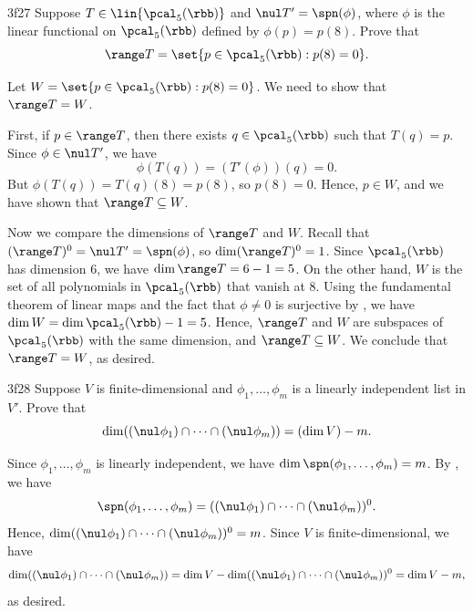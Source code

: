\begin{exercise}{3f27}
    Suppose $T \in \lin{\pcal_5(\rbb)}$ and $\nul T' = \spn(\phi)$, where $\phi$ is the linear functional on $\pcal_5(\rbb)$ defined by $\phi(p) = p(8)$.
	Prove that
    \[
    	\range T = \set{p \in \pcal_5(\rbb) : p(8) = 0}.
    \]
\end{exercise}

\begin{sol}
    Let $W = \set{p \in \pcal_5(\rbb) : p(8) = 0}$.
	We need to show that $\range T = W$.

    First, if $p \in \range T$, then there exists $q \in \pcal_5(\rbb)$ such that $T(q) = p$.
	Since $\phi \in \nul T'$, we have
    \[
    	\phi(T(q)) = (T'(\phi))(q) = 0.
    \]
    But $\phi(T(q)) = T(q)(8) = p(8)$, so $p(8) = 0$.
	Hence, $p \in W$, and we have shown that $\range T \subseteq W$.

    Now we compare the dimensions of $\range T$ and $W$.
	Recall that $(\range T)^0 = \nul T' = \spn(\phi)$, so $\dim (\range T)^0 = 1$.
	Since $\pcal_5(\rbb)$ has dimension $6$, we have $\dim \range T = 6 - 1 = 5$.
	On the other hand, $W$ is the set of all polynomials in $\pcal_5(\rbb)$ that vanish at $8$.
	Using the fundamental theorem of linear maps and the fact that $\phi \neq 0$ is surjective by , we have $\dim W = \dim \pcal_5(\rbb) - 1 = 5$.
	Hence, $\range T$ and $W$ are subspaces of $\pcal_5(\rbb)$ with the same dimension, and $\range T \subseteq W$.
	We conclude that $\range T = W$, as desired.
\end{sol}

\begin{exercise}{3f28}
    Suppose $V$ is finite-dimensional and $\phi_1, \ldots, \phi_m$ is a linearly independent list in $V'$.
	Prove that
    \[
    	\dim((\nul \phi_1) \cap \cdots \cap (\nul \phi_m)) = (\dim V) - m.
    \]
\end{exercise}

\begin{sol}
    Since $\phi_1, \ldots, \phi_m$ is linearly independent, we have $\dim \spn(\phi_1, \ldots, \phi_m) = m$.
	By , we have
    \[
    	\spn(\phi_1, \ldots, \phi_m) = ((\nul \phi_1) \cap \cdots \cap (\nul \phi_m))^0.
    \]
    Hence, $\dim((\nul \phi_1) \cap \cdots \cap (\nul \phi_m))^0 = m$.
	Since $V$ is finite-dimensional, we have
    \[
    	\dim((\nul \phi_1) \cap \cdots \cap (\nul \phi_m)) = \dim V - \dim((\nul \phi_1) \cap \cdots \cap (\nul \phi_m))^0 = \dim V - m,
    \]
    as desired.
\end{sol}

